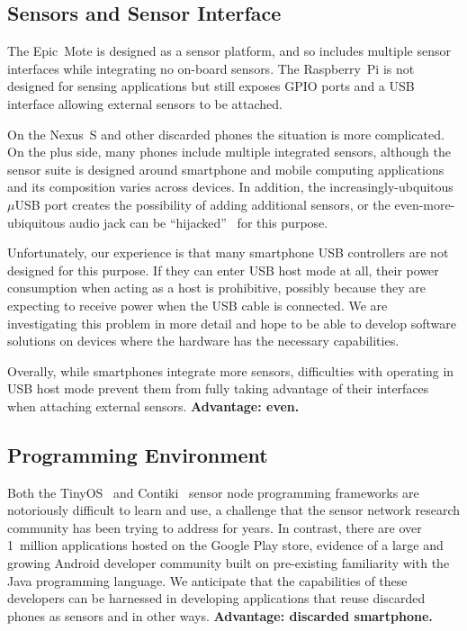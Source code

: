 \subsection{Sensors and Sensor Interface}

The Epic~Mote is designed as a sensor platform, and so includes multiple
sensor interfaces while integrating no on-board sensors. The Raspberry~Pi is
not designed for sensing applications but still exposes GPIO ports and a USB
interface allowing external sensors to be attached.

On the Nexus~S and other discarded phones the situation is more complicated.
On the plus side, many phones include multiple integrated sensors, although
the sensor suite is designed around smartphone and mobile computing
applications and its composition varies across devices. In addition, the
increasingly-ubquitous $\mu$USB port creates the possibility of adding
additional sensors, or the even-more-ubiquitous audio jack can be
``hijacked''~\cite{FIXME-audiohijak} for this purpose.

Unfortunately, our experience is that many smartphone USB controllers are not
designed for this purpose. If they can enter USB host mode at all, their
power consumption when acting as a host is prohibitive, possibly because they
are expecting to receive power when the USB cable is connected. We are investigating this problem in more
detail and hope to be able to develop software solutions on devices where the
hardware has the necessary capabilities.

Overally, while smartphones integrate more sensors, difficulties with
operating in USB host mode prevent them from fully taking advantage of their
interfaces when attaching external sensors. \textbf{Advantage: even.}

\subsection{Programming Environment}

Both the TinyOS~\cite{tinyos} and Contiki~\cite{contiki} sensor
node programming frameworks are notoriously difficult to learn and use, a
challenge that the sensor network research community has been trying to
address for years. In contrast, there are over 1~million applications hosted
on the Google Play store, evidence of a large and growing Android developer
community built on pre-existing familiarity with the Java programming
language. We anticipate that the capabilities of these developers can be
harnessed in developing applications that reuse discarded phones as sensors
and in other ways. \textbf{Advantage: discarded smartphone.}


